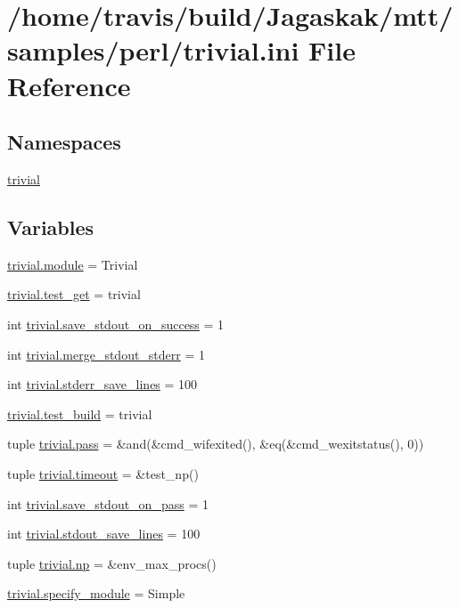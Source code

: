 \hypertarget{trivial_8ini}{\section{/home/travis/build/\-Jagaskak/mtt/samples/perl/trivial.ini File Reference}
\label{trivial_8ini}
}
\subsection*{Namespaces}
\begin{DoxyCompactItemize}
\item 
\hyperlink{namespacetrivial}{trivial}
\end{DoxyCompactItemize}
\subsection*{Variables}
\begin{DoxyCompactItemize}
\item 
\hyperlink{namespacetrivial_a3e713ea5d6e77bf165eeaafc02275430}{trivial.\-module} = Trivial
\item 
\hyperlink{namespacetrivial_afe75cace659f04749ee3f7c818152b7b}{trivial.\-test\-\_\-get} = trivial
\item 
int \hyperlink{namespacetrivial_af272dc5ab194f706f77eeb74de7b8c97}{trivial.\-save\-\_\-stdout\-\_\-on\-\_\-success} = 1
\item 
int \hyperlink{namespacetrivial_a8c1d5357654e053cf4d0b8a7f48ff13b}{trivial.\-merge\-\_\-stdout\-\_\-stderr} = 1
\item 
int \hyperlink{namespacetrivial_af6ee4456e84c354e7845aae7ea24d022}{trivial.\-stderr\-\_\-save\-\_\-lines} = 100
\item 
\hyperlink{namespacetrivial_aa612b0f8daffd666959f885b6ba54cd0}{trivial.\-test\-\_\-build} = trivial
\item 
tuple \hyperlink{namespacetrivial_a65b4003f52ce4fa5d324695f54c1e3b3}{trivial.\-pass} = \&and(\&cmd\-\_\-wifexited(), \&eq(\&cmd\-\_\-wexitstatus(), 0))
\item 
tuple \hyperlink{namespacetrivial_a8ce5c7e487f1c21edda391cc47830f5e}{trivial.\-timeout} = \&test\-\_\-np()
\item 
int \hyperlink{namespacetrivial_aefbe39eb9fcb8a58d4e04dd980e35062}{trivial.\-save\-\_\-stdout\-\_\-on\-\_\-pass} = 1
\item 
int \hyperlink{namespacetrivial_aee208868790b8c2d6d9f48ad238aa6c5}{trivial.\-stdout\-\_\-save\-\_\-lines} = 100
\item 
tuple \hyperlink{namespacetrivial_adfe4da0e2d8f3078b198c0f76ee394dd}{trivial.\-np} = \&env\-\_\-max\-\_\-procs()
\item 
\hyperlink{namespacetrivial_af5dae1522345f303cfb4527587cd5361}{trivial.\-specify\-\_\-module} = Simple
\end{DoxyCompactItemize}
